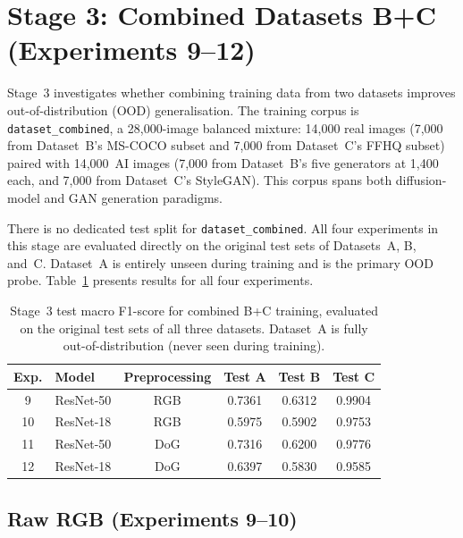 
\section{Stage 3: Combined Datasets B+C (Experiments 9--12)}
\label{sec:stage3}

Stage~3 investigates whether combining training data from two datasets improves
out-of-distribution (OOD) generalisation. The training corpus is \texttt{dataset\_combined},
a 28,000-image balanced mixture: 14,000 real images (7,000 from Dataset~B's MS-COCO
subset and 7,000 from Dataset~C's FFHQ subset) paired with 14,000~AI images (7,000
from Dataset~B's five generators at 1,400 each, and 7,000 from Dataset~C's StyleGAN).
This corpus spans both diffusion-model and GAN generation paradigms.

There is no dedicated test split for \texttt{dataset\_combined}. All four experiments in
this stage are evaluated directly on the original test sets of Datasets~A, B, and~C.
Dataset~A is entirely unseen during training and is the primary OOD probe.
Table~\ref{tab:stage3_results} presents results for all four experiments.

\begin{table}[tb]
  \centering
  \caption{Stage~3 test macro F1-score for combined B+C training, evaluated on the
           original test sets of all three datasets. Dataset~A is fully out-of-distribution
           (never seen during training).}
  \label{tab:stage3_results}
  \begin{tabular}{clcccc}
    \hline
    \textbf{Exp.} & \textbf{Model} & \textbf{Preprocessing} & \textbf{Test A} & \textbf{Test B} & \textbf{Test C} \\
    \hline
    9  & ResNet-50 & RGB & 0.7361 & 0.6312 & 0.9904 \\
    10 & ResNet-18 & RGB & 0.5975 & 0.5902 & 0.9753 \\
    11 & ResNet-50 & DoG & 0.7316 & 0.6200 & 0.9776 \\
    12 & ResNet-18 & DoG & 0.6397 & 0.5830 & 0.9585 \\
    \hline
  \end{tabular}
\end{table}

\subsection{Raw RGB (Experiments 9--10)}
\label{sec:stage3_rgb}

